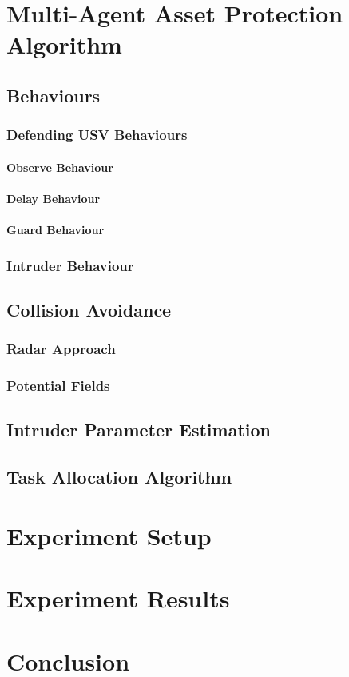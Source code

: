 \documentclass[bsc,frontabs,twoside,singlespacing,parskip,deptreport]{infthesis}     %
\begin{document}
\chapter{Multi-Agent Asset Protection Algorithm}
\section{Behaviours}
\subsection{Defending USV Behaviours}
\subsubsection{Observe Behaviour}
\subsubsection{Delay Behaviour}
\subsubsection{Guard Behaviour}
\subsection{Intruder Behaviour}
\section{Collision Avoidance}
\subsection{Radar Approach}
\subsection{Potential Fields}
\section{Intruder Parameter Estimation}
\section{Task Allocation Algorithm}
\chapter{Experiment Setup}
\chapter{Experiment Results}
\chapter{Conclusion}



\end{document}
